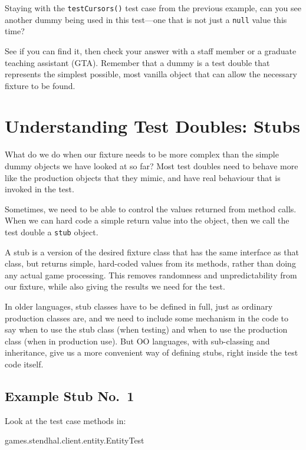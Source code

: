 \documentclass[
]{book}
\newenvironment{Shaded}{\begin{snugshade}}{\end{snugshade}}
\newcommand{\FunctionTok}[1]{\textcolor[rgb]{0.00,0.00,0.00}{#1}}
\newcommand{\NormalTok}[1]{#1}
\begin{document}
Staying with the \texttt{testCursors()} test case from the previous example, can you see another dummy being used in this test---one that is not just a \texttt{null} value this time?

See if you can find it, then check your answer with a staff member or a graduate teaching assistant (GTA). Remember that a dummy is a test double that represents the simplest possible, most vanilla object that can allow the necessary fixture to be found.

\hypertarget{stubs}{%
\section{Understanding Test Doubles: Stubs}\label{stubs}}

What do we do when our fixture needs to be more complex than the simple dummy objects we have looked at so far? Most test doubles need to behave more like the production objects that they mimic, and have real behaviour that is invoked in the test.

Sometimes, we need to be able to control the values returned from method calls. When we can hard code a simple return value into the object, then we call the test double a \texttt{stub} object.

A stub is a version of the desired fixture class that has the same interface as that class, but returns simple, hard-coded values from its methods, rather than doing any actual game processing. This removes randomness and unpredictability from our fixture, while also giving the results we need for the test.

In older languages, stub classes have to be defined in full, just as ordinary production classes are, and we need to include some mechanism in the code to say when to use the stub class (when testing) and when to use the production class (when in production use). But OO languages, with sub-classing and inheritance, give us a more convenient way of defining stubs, right inside the test code itself.

\hypertarget{stubby1}{%
\subsection{Example Stub No.~1}\label{stubby1}}

Look at the test case methods in:

\begin{Shaded}
\begin{Highlighting}[]
\NormalTok{games.}\FunctionTok{stendhal}\NormalTok{.}\FunctionTok{client}\NormalTok{.}\FunctionTok{entity}\NormalTok{.}\FunctionTok{EntityTest}
\end{Highlighting}
\end{Shaded}
\end{document}

